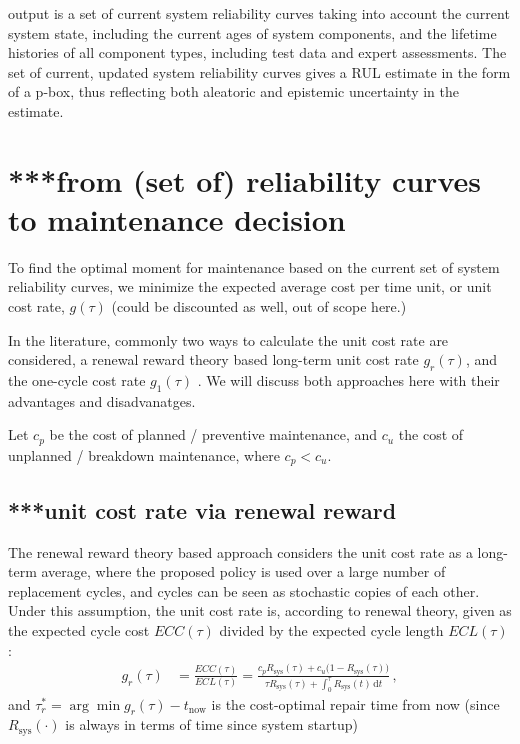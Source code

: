 \documentclass[authoryear]{elsarticle}
\newcommand{\dd}{\,\mathrm{d}}
\newcommand{\Rsys}{R_\text{sys}}
\def\tnow{t_\text{now}}
\begin{document}
output is a set of current system reliability curves
taking into account the current system state,
including the current ages of system components, 
and the lifetime histories of all component types,
including test data and expert assessments.
The set of current, updated system reliability curves gives a RUL estimate
in the form of a p-box, thus reflecting both aleatoric and epistemic uncertainty in the estimate.


\section{***from (set of) reliability curves to maintenance decision}

To find the optimal moment for maintenance based on the current set of system reliability curves,
we minimize the expected average cost per time unit,
or unit cost rate, $g(\tau)$ %
(could be discounted as well, out of scope here.)

In the literature, commonly two ways to calculate the unit cost rate are considered,
a renewal reward theory based long-term unit cost rate $g_r(\tau)$,
and the one-cycle cost rate $g_1(\tau)$ \citep{1996:mazzuchi-soyer}.
We will discuss both approaches here with their advantages and disadvanatges.

Let $c_p$ be the cost of planned / preventive maintenance, and $c_u$ the cost of unplanned / breakdown maintenance, where $c_p < c_u$.

\subsection{***unit cost rate via renewal reward}

The renewal reward theory based approach considers the unit cost rate as a long-term average,
where the proposed policy is used over a large number of replacement cycles,
and cycles can be seen as stochastic copies of each other.
Under this assumption, the unit cost rate is, according to renewal theory,
given as the expected cycle cost $ECC(\tau)$ divided by the expected cycle length $ECL(\tau)$:
\begin{align}
g_r(\tau) &= \frac{ECC(\tau)}{ECL(\tau)} = \frac{c_p \Rsys(\tau) + c_u \big(1-\Rsys(\tau)\big)}{\tau \Rsys(\tau) + \int_0^\tau \Rsys(t) \dd t}\,,
\end{align}
and $\tau_r^* = \arg\min g_r(\tau) - \tnow$ is the cost-optimal repair time from now
(since $\Rsys(\cdot)$ is always in terms of time since system startup)
\end{document}
